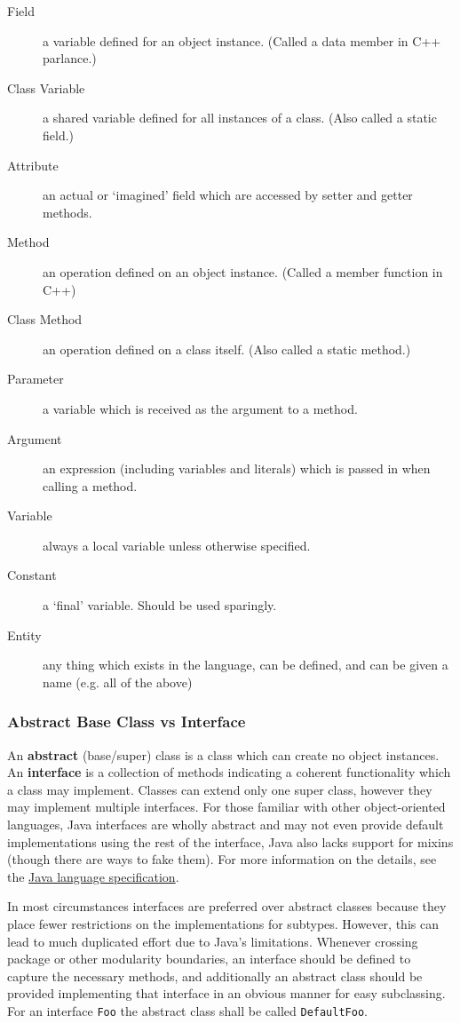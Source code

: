  \begin{description}
 \item[Field] a variable defined for an object instance. (Called a data member in C++ parlance.)
 \item[Class Variable] a shared variable defined for all instances of a class. (Also called a static field.)
 \item[Attribute] an actual or `imagined' field which are accessed by setter and getter methods.
 \item[Method] an operation defined on an object instance. (Called a member function in C++)
 \item[Class Method] an operation defined on a class itself. (Also called a static method.)
 \item[Parameter] a variable which is received as the argument to a method.
 \item[Argument] an expression (including variables and literals) which is passed in when calling a method.
 \item[Variable] always a local variable unless otherwise specified.
 \item[Constant] a `final' variable. Should be used sparingly.
 \item[Entity] any thing which exists in the language, can be defined, and can be given a name (e.g. all of the above) 
 \end{description}


\subsubsection{Abstract Base Class vs Interface}
An {\bf abstract} (base/super) class is a class which can create no object instances. An {\bf interface} is a collection of methods indicating a coherent functionality which a class may implement. Classes can extend only one super class, however they may implement multiple interfaces. For those familiar with other object-oriented languages, Java interfaces are wholly abstract and may not even provide default implementations using the rest of the interface, Java also lacks support for mixins (though there are ways to fake them). For more information on the details, see the \href{http://java.sun.com/docs/books/jls/second_edition/html/jTOC.doc.html}{Java language specification}.

In most circumstances interfaces are preferred over abstract classes because they place fewer restrictions on the implementations for subtypes. However, this can lead to much duplicated effort due to Java's limitations. Whenever crossing package or other modularity boundaries, an interface should be defined to capture the necessary methods, and additionally an abstract class should be provided implementing that interface in an obvious manner for easy subclassing. For an interface {\tt Foo} the abstract class shall be called {\tt DefaultFoo}.

